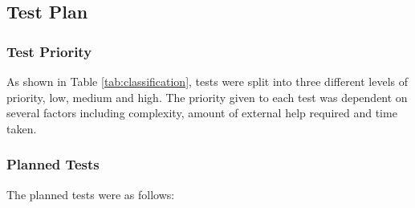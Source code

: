 
\pagebreak
\subsection{Test Plan}

\subsubsection{Test Priority} \label{sec:5.2.1-testpriority}
As shown in Table \ref{tab:classification}, tests were split into three different levels of priority, low, medium and high. The priority given to each test was dependent on several factors including complexity, amount of external help required and time taken. 



\subsubsection{Planned Tests}
The planned tests were as follows:

